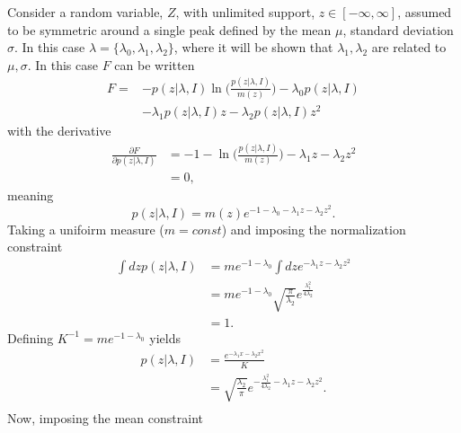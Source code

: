 \begin{example}
	Consider a random variable, $Z$, with unlimited support, $z\in [-\infty,\infty]$, assumed to be symmetric around a single peak defined by the mean $\mu$, standard deviation $\sigma$. In this case $\lambda = \{\lambda_0,\lambda_1,\lambda_2\}$, where it will be shown that $\lambda_1,\lambda_2$ are related to $\mu,\sigma$. In this case $F$ can be written\label{ex:gauss}
	\begin{equation}
		\begin{split}
			F =& -p(z|\lambda,I)\ln\bigg(\frac{p(z|\lambda,I)}{m(z)}\bigg)-\lambda_0p(z|\lambda,I)\\
			&-\lambda_1p(z|\lambda,I)z-\lambda_2p(z|\lambda,I)z^2
		\end{split}
	\end{equation}
	with the derivative
	\begin{equation}
		\begin{split}
			\frac{\partial F}{\partial p(z|\lambda,I)} &= -1-\ln\bigg(\frac{p(z|\lambda,I)}{m(z)}\bigg)-\lambda_1z-\lambda_2z^2\\
			&=0,
		\end{split}
	\end{equation}
	meaning
	\begin{equation}
		p(z|\lambda,I)=m(z)e^{-1-\lambda_0-\lambda_1z-\lambda_2z^2}.
	\end{equation}
	Taking a unifoirm measure ($m= const$) and imposing the normalization constraint
	\begin{equation}
		\begin{split}
			\int dz p(z|\lambda,I) &= me^{-1-\lambda_0}\int dz e^{-\lambda_1z-\lambda_2z^2}\\
			&= me^{-1-\lambda_0}\sqrt{\frac{\pi}{\lambda_2}}e^{\frac{\lambda_1^2}{4\lambda_2}}\\
			&=1.
		\end{split}
	\end{equation}
	Defining $K^{-1} = me^{-1-\lambda_0}$ yields
	\begin{equation}
		\begin{split}
			p(z|\lambda,I) &= \frac{e^{-\lambda_1x-\lambda_2x^2}}{K}\\
			&= \sqrt{\frac{\lambda_2}{\pi}}e^{-\frac{\lambda_1^2}{4\lambda_2}-\lambda_1z-\lambda_2z^2}.\\
		\end{split}
	\end{equation}
	Now, imposing the mean constraint

\end{example}
